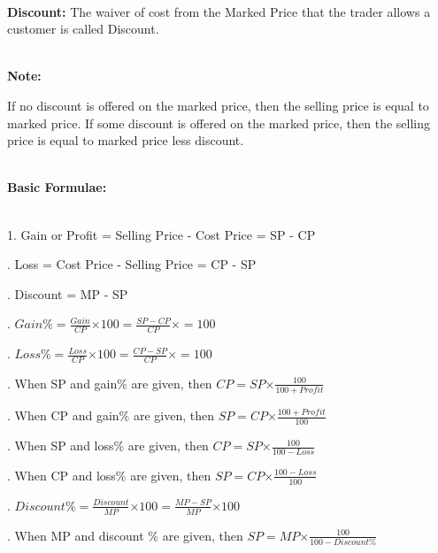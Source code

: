 \documentclass{article}
\begin{document}
\noindent \\ \textbf{Discount:  }The waiver of cost from the Marked Price that the trader allows a customer is called Discount.

\noindent 

\noindent \\ \textbf{Note:}

\noindent 

\noindent If no discount is offered on the marked price, then the selling price is equal to marked price. If some discount is offered on the marked price, then the selling price is equal to marked price less discount.

\noindent 

\noindent \\ \textbf{Basic Formulae:}

\noindent 

\noindent 

\noindent 

\noindent \\ 1.   Gain or Profit = Selling Price - Cost Price = SP - CP

\noindent 

.   Loss = Cost Price - Selling Price = CP - SP

\noindent 

.   Discount = MP - SP

.  $ Gain\% =  \frac{Gain}{CP} \mathrm{\times} 100 = \frac{SP - CP}{CP} \mathrm{\times} = 100$

\noindent 

.  $ Loss\% =  \frac{Loss}{CP} \mathrm{\times} 100 = \frac{CP - SP}{CP} \mathrm{\times} = 100$

.   When SP and gain\% are given, then $  CP = SP \mathrm{\times} \frac{100}{100+Profit} $

.   When CP and gain\% are given, then $  SP = CP \mathrm{\times} \frac{100+Profit}{100} $

.   When SP and loss\% are given, then $  CP = SP \mathrm{\times} \frac{100}{100-Loss} $

.   When CP and loss\% are given, then $  SP = CP \mathrm{\times} \frac{100-Loss}{100} $

. $  Discount\% = \frac{Discount}{MP} \mathrm{\times} 100 = \frac{MP -SP}{MP} \mathrm{\times} 100$

. When MP and discount \% are given, then $ SP = MP  \mathrm{\times} \frac{100}{100 - Discount\%}$
\end{document}
